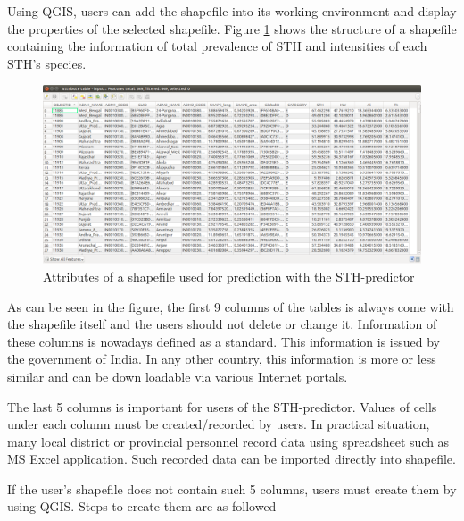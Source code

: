 \documentclass[12pt,oneside]{memoir}
\begin{document}
Using QGIS, users can add the shapefile into its working environment and display the properties of the selected shapefile. Figure \ref{shapfileattribute} shows the structure of a shapefile containing the information of total prevalence of STH and intensities of each STH's species.

\begin{figure}[H]
\centering
\includegraphics[scale=0.4]{shapfileattribute} 
\caption{Attributes of a shapefile used for prediction with the STH-predictor} 
\label{shapfileattribute}
\end{figure}

As can be seen in the figure, the first 9 columns of the tables is always come with the shapefile itself and the users should not delete or change it. Information of these columns is nowadays defined as a standard. This information is issued by the government of India. In any other country, this information is more or less similar and can be down loadable via various Internet portals.

The last 5 columns is important for users of the STH-predictor. Values of cells under each column must be created/recorded by users. In practical situation, many local district or provincial personnel record data using spreadsheet such as MS Excel application. Such recorded data can be imported directly into shapefile. 

If the user's shapefile does not contain such 5 columns, users must create them by using QGIS. Steps to create them are as followed
\end{document}
